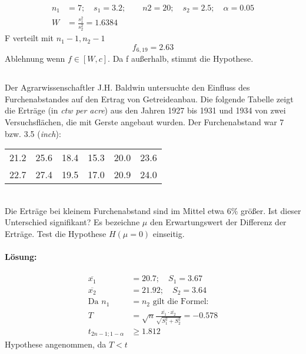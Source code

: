 \documentclass[ngerman]{scrartcl}
\begin{document}
\begin{align*}
n_1 &= 7;\quad s_1 = 3.2;\qquad n2 = 20;\quad s_2 = 2.5;\quad \alpha = 0.05\\
W &= \frac{s_1^2}{s_2^2} = 1.6384
\end{align*}
F verteilt mit $n_1-1, n_2-1$\[
f_{6,19} = 2.63
\]
Ablehnung wenn $f\in [W,c]$. Da f außerhalb, stimmt die Hypothese.
\subsection{}
Der Agrarwissenschaftler J.H. Baldwin untersuchte den Einfluss des Furchenabstandes auf den Ertrag von Getreideanbau. Die folgende Tabelle zeigt die Erträge (in \emph{ctw per acre}) aus den Jahren 1927 bis 1931 und 1934 von zwei Versuchsflächen, die mit Gerste angebaut wurden. Der Furchenabstand war 7 bzw. 3.5 (\emph{inch}):\\
\begin{tabular}{c c c c c c}
\hline
21.2& 25.6& 18.4& 15.3& 20.0& 23.6\\
22.7& 27.4& 19.5& 17.0& 20.9& 24.0\\\hline
\end{tabular}\\
Die Erträge bei kleinem Furchenabstand sind im Mittel etwa $6\%$ größer. Ist dieser Unterschied signifikant? Es bezeichne $\mu$ den Erwartungswert der Differenz der Erträge. Test die Hypothese $H(\mu = 0)$ einseitig.
\paragraph{Lösung:}
\begin{align*}
\overline{x_1} &= 20.7;\quad S_1 = 3.67\\
\overline{x_2} &= 21.92;\quad S_2 = 3.64\\
\text{Da } n_1&= n_2\text{ gilt die Formel:}\\
T &= \sqrt{n}\frac{\overline{x_1}\cdot \overline{x_2}}{\sqrt{S_1^{2} + S_2^{2}}} = -0.578\\
t_{2n-1;1-\alpha} &\ge 1.812
\end{align*}
Hypothese angenommen, da $T < t$
\end{document}
